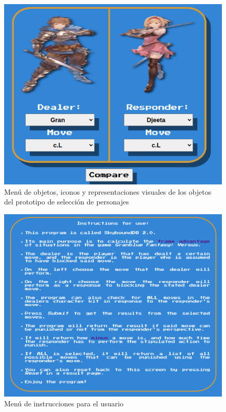 \begin{center}
    \begin{figure}[ht!]
        \centering
        \includegraphics[height=0.4\textheight]{figures/Character_select_menu-object.png}
        \caption{Menú de objetos, iconos y representaciones visuales de los objetos del prototipo de selección de personajes}
        \label{fig: char sel prt}
    \end{figure}
    
    \begin{figure}
        \centering
        \includegraphics[height=0.4\textheight]{figures/Instructions_menu-object.png}
        \caption{Menú de instrucciones para el usuario}
        \label{fig: ins prt}
    \end{figure}
    

\end{center}
